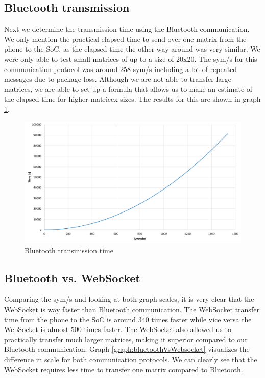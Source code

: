 \documentclass[a4paper, 11pt]{report}
\begin{document}
\subsection{Bluetooth transmission}
Next we determine the transmission time using the Bluetooth communication. We only mention the practical elapsed time to send over one matrix from the phone to the SoC, as the elapsed time the other way around was very similar. We were only able to test small matrices of up to a size of 20x20. The sym/s for this communication protocol was around 258 sym/s including a lot of repeated messages due to package loss. Although we are not able to transfer large matrices, we are able to set up a formula that allows us to make an estimate of the elapsed time for higher matricex sizes. The results for this are shown in graph \ref{graph:bluetoothTime}.

\begin{figure}[ht]
\centering
\includegraphics[scale=0.45]{images/BluetoothtransmissionSpeed.pdf}
\caption{Bluetooth transmission time}\label{graph:bluetoothTime}
\end{figure}

\subsection{Bluetooth vs. WebSocket}
Comparing the sym/s and looking at both graph scales, it is very clear that the WebSocket is way faster than Bluetooth communication. The WebSocket transfer time from the phone to the SoC is around 340 times faster while vice versa the WebSocket is almost 500 times faster. The WebSocket also allowed us to practically transfer much larger matrices, making it superior compared to our Bluetooth communication. Graph \ref{graph:bluetoothVsWebsocket} visualizes the difference in scale for both communication protocols. We can clearly see that the WebSocket requires less time to transfer one matrix compared to Bluetooth.
\end{document}
